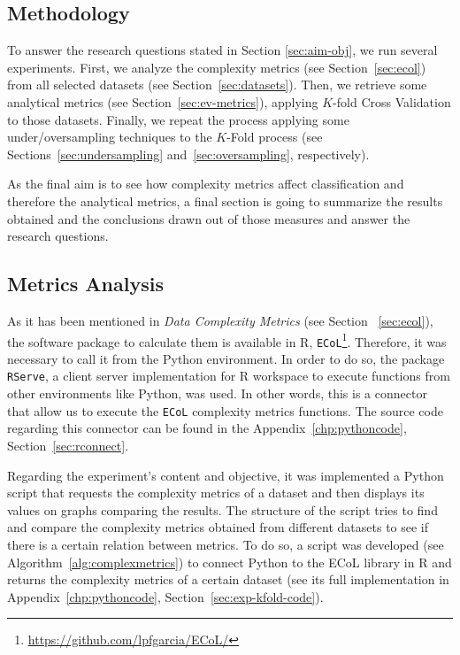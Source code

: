 \subsection{Methodology}

To answer the research questions stated in Section \ref{sec:aim-obj}, we run 
several experiments. First, we analyze the complexity metrics (see 
Section~\ref{sec:ecol}) from all selected datasets (see 
Section~\ref{sec:datasets}). Then, we retrieve some analytical metrics (see 
Section~\ref{sec:ev-metrics}), applying $K$-fold Cross
Validation to those datasets. Finally, we repeat the process applying some 
under/oversampling techniques to the $K$-Fold process (see 
Sections~\ref{sec:undersampling} and~\ref{sec:oversampling}, respectively).

As the final aim is to see how complexity metrics affect classification and 
therefore the analytical metrics, a final section is going to summarize the 
results obtained and the conclusions drawn out of those measures and answer the 
research questions.

\subsection{Metrics Analysis}

As it has been mentioned in \textit{Data Complexity Metrics} (see 
Section ~\ref{sec:ecol}), the software package to calculate them is 
available in R, 
\texttt{ECoL}\footnote{\url{https://github.com/lpfgarcia/ECoL/}}. Therefore, it
was necessary to call it from the Python environment. In order to do so, the 
package \texttt{RServe}, a client server implementation for R workspace to 
execute functions from other environments like Python, was used. In other words, 
this is a connector that allow us to execute the \texttt{ECoL} complexity
metrics functions. The source code regarding this connector can be found in the 
Appendix~\ref{chp:pythoncode}, Section~\ref{sec:rconnect}.

Regarding the experiment's content and objective, it was implemented a Python 
script that requests the complexity metrics of a dataset and then displays its 
values on graphs comparing the results. The structure of the script tries to 
find and compare the complexity metrics obtained from different datasets to see 
if there is a certain relation between metrics. To do so, a script was developed 
(see Algorithm~\ref{alg:complexmetrics}) to connect Python to the ECoL library 
in R and returns the complexity metrics of a certain dataset (see its full 
implementation in Appendix~\ref{chp:pythoncode}, 
Section~\ref{sec:exp-kfold-code}).

